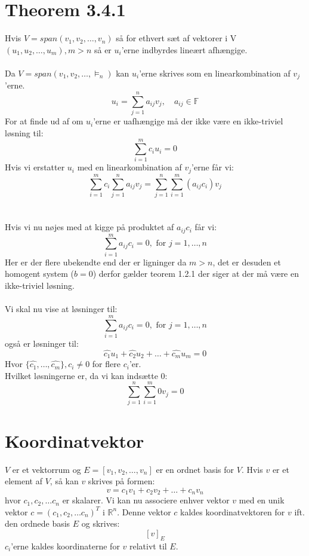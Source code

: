 \documentclass[a4paper,oneside,article]{memoir}
\begin{document}
	 \section{Theorem 3.4.1}
	 Hvis $V=span(v_1,v_2,\dots,v_n)$ så for ethvert sæt af vektorer 
	 i V $(u_1,u_2,\dots,u_m), m>n$ så er $u_i$'erne indbyrdes
	 lineært afhængige.
	 \\
	 \\
	 Da $V=span(v_1,v_2,\dots,\vDash_n)$ kan $u_i$'erne skrives 
	 som en linearkombination af $v_j$'erne.
	 $$u_i=\sum\limits_{j=1}^{n}a_{ij}v_j, \quad a_{ij}\in \mathbb{F}$$
	 For at finde ud af om $u_i$'erne er uafhængige må der ikke
	 være en ikke-triviel løsning til:
	 $$\sum\limits_{i=1}^{m}c_iu_i=0$$
	 Hvis vi erstatter $u_i$ med en linearkombination af $v_j$'erne 
	 får vi:
	 $$\sum\limits_{i=1}^{m}c_i\sum\limits_{j=1}^{n}a_{ij}v_j=
	 \sum\limits_{j=1}^{n}\sum\limits_{i=1}^{m}(a_{ij}c_i)v_j$$
	 \\
	 \\
	 Hvis vi nu nøjes med at kigge på produktet af $a_{ij}c_i$
	 får vi:
	 $$\sum\limits_{i=1}^{m}a_{ij}c_i=0,\text{ for } j=1,\dots,n$$
	 Her er der flere ubekendte end der er ligninger da $m>n$,
	 det er desuden et homogent system ($b=0$) derfor gælder
	 teorem 1.2.1 der siger at der må være en ikke-triviel
	 løsning.
	 \\
	 \\
	 Vi skal nu vise at løsninger til:
	 $$\sum\limits_{i=1}^{m}a_{ij}c_i=0,\text{ for } j=1,\dots,n$$
	 også er løsninger til:
	 $$\hat{c_1}u_1+\hat{c_2}u_2+\dots+\hat{c_m}u_m=0$$
	 Hvor $\{\hat{c_1},\dots,\hat{c_m}\}, c_i \neq 0$ for flere 
	 $c_i$'er.\\
	 Hvilket løsningerne er, da vi kan indsætte 0:
	 $$\sum\limits_{j=1}^{n}\sum\limits_{i=1}^{m}0v_j=0$$
	
	\section{Koordinatvektor}
	$V$ er et vektorrum og $E=[v_1,v_2,\dots,v_n]$ er en ordnet
	basis for $V$. Hvis $v$ er et element af $V$, så kan $v$ 
	skrives på formen:
	$$v=c_1v_1+c_2v_2+\dots + c_nv_n$$
	hvor $c_1,c_2,\dots c_n$ er skalarer. Vi kan nu associere
	enhver vektor $v$ med en unik vektor $c=(c_1,c_2,\dots c_n)^T$ 
	i $\mathbb{R}^n$. Denne vektor $c$ kaldes koordinatvektoren 
	for $v$ ift. den ordnede basis $E$ og skrives:
	$$[v]_E$$
	$c_i$'erne kaldes koordinaterne for $v$ relativt til $E$.
	
\end{document}
